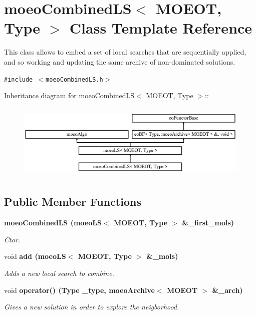 \section{moeo\-Combined\-LS$<$ MOEOT, Type $>$ Class Template Reference}
\label{classmoeoCombinedLS}
This class allows to embed a set of local searches that are sequentially applied, and so working and updating the same archive of non-dominated solutions.  


{\tt \#include $<$moeo\-Combined\-LS.h$>$}

Inheritance diagram for moeo\-Combined\-LS$<$ MOEOT, Type $>$::\begin{figure}[H]
\begin{center}
\leavevmode
\includegraphics[height=3.69637cm]{classmoeoCombinedLS}
\end{center}
\end{figure}
\subsection*{Public Member Functions}
\begin{CompactItemize}
\item 
\bf{moeo\-Combined\-LS} (\bf{moeo\-LS}$<$ MOEOT, Type $>$ \&\_\-first\_\-mols)
\begin{CompactList}\small\item\em Ctor. \item\end{CompactList}\item 
void \bf{add} (\bf{moeo\-LS}$<$ MOEOT, Type $>$ \&\_\-mols)
\begin{CompactList}\small\item\em Adds a new local search to combine. \item\end{CompactList}\item 
void \bf{operator()} (Type \_\-type, \bf{moeo\-Archive}$<$ MOEOT $>$ \&\_\-arch)
\begin{CompactList}\small\item\em Gives a new solution in order to explore the neigborhood. \item\end{CompactList}\end{CompactItemize}
